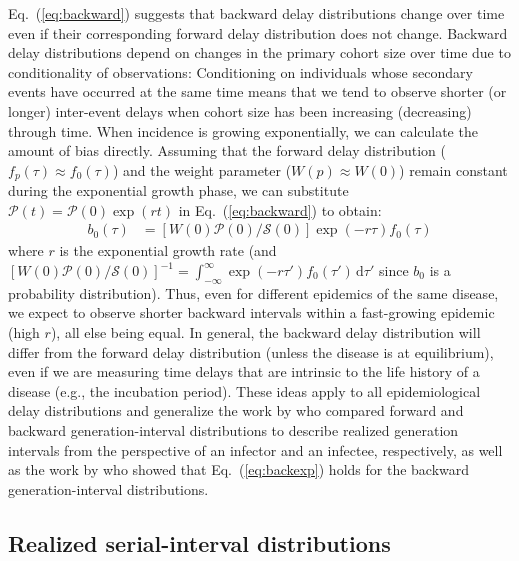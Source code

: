 \documentclass[12pt]{article}
\newcommand{\eref}[1]{Eq.~(\ref{eq:#1})}
\newcommand{\dd}[1]{\ensuremath{\, \mathrm{d}#1}}
\newcommand{\dtau}{\dd{\tau}}
\newcommand{\psymp}{\ensuremath{p}} %
\newcommand{\psize}{{\mathcal P}} %
\newcommand{\ssize}{{\mathcal S}} %
\begin{document}
\eref{backward} suggests that backward delay distributions change over time even if their corresponding forward delay distribution does not change.
Backward delay distributions depend on changes in the primary cohort size over time due to conditionality of observations:
Conditioning on individuals whose secondary events have occurred at the same time means that we tend to observe shorter (or longer) inter-event delays when cohort size has been increasing (decreasing) through time.
When incidence is growing exponentially, we can calculate the amount of bias directly.
Assuming that the forward delay distribution ($f_\psymp(\tau) \approx f_0(\tau)$) and the weight parameter ($W(\psymp) \approx W(0)$) remain constant during the exponential growth phase, we can substitute $\psize(t) = \psize(0) \exp(rt)$ in \eref{backward} to obtain:
\begin{align}
b_0(\tau) &= \left[ W(0) \psize(0)/\ssize(0)\right] \exp(-r\tau) f_0(\tau)
\label{eq:backexp}
\end{align}
where $r$ is the exponential growth rate (and $\left[W(0) \psize(0)/\ssize(0)\right]^{-1} = \int_{-\infty}^{\infty} \exp(-r\tau') f_0(\tau') \dtau'$ since $b_0$ is a probability distribution).
Thus, even for different epidemics of the same disease, we expect to observe shorter backward intervals within a fast-growing epidemic (high $r$), all else being equal.
In general, the backward delay distribution will differ from the forward delay distribution (unless the disease is at equilibrium), even if we are measuring time delays that are intrinsic to the life history of a disease (e.g., the incubation period).
These ideas apply to all epidemiological delay distributions and generalize the work by \cite{champredon2015intrinsic} who compared forward and backward generation-interval distributions to describe realized generation intervals from the perspective of an infector and an infectee, respectively, as well as the work by \cite{britton2019estimation} who showed that \eref{backexp} holds for the backward generation-interval distributions.

\subsection{Realized serial-interval distributions}
\end{document}
